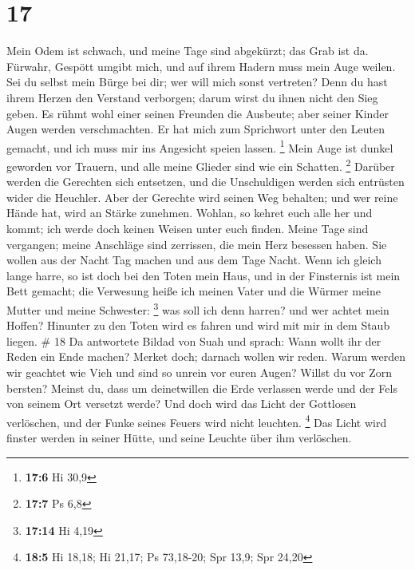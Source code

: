 \hypertarget{section-4}{%
\section{17}\label{section-4}}

 Mein Odem ist schwach, und meine Tage sind abgekürzt; das
Grab ist da.  Fürwahr, Gespött umgibt mich, und auf ihrem
Hadern muss mein Auge weilen.  Sei du selbst mein Bürge
bei dir; wer will mich sonst vertreten?  Denn du hast
ihrem Herzen den Verstand verborgen; darum wirst du ihnen nicht den Sieg
geben.  Es rühmt wohl einer seinen Freunden die Ausbeute;
aber seiner Kinder Augen werden verschmachten.  Er hat
mich zum Sprichwort unter den Leuten gemacht, und ich muss mir ins
Angesicht speien lassen. \footnote{\textbf{17:6} Hi 30,9} 
Mein Auge ist dunkel geworden vor Trauern, und alle meine Glieder sind
wie ein Schatten. \footnote{\textbf{17:7} Ps 6,8}  Darüber
werden die Gerechten sich entsetzen, und die Unschuldigen werden sich
entrüsten wider die Heuchler.  Aber der Gerechte wird
seinen Weg behalten; und wer reine Hände hat, wird an Stärke zunehmen.
 Wohlan, so kehret euch alle her und kommt; ich werde
doch keinen Weisen unter euch finden.  Meine Tage sind
vergangen; meine Anschläge sind zerrissen, die mein Herz besessen haben.
 Sie wollen aus der Nacht Tag machen und aus dem Tage
Nacht.  Wenn ich gleich lange harre, so ist doch bei den
Toten mein Haus, und in der Finsternis ist mein Bett gemacht;
 die Verwesung heiße ich meinen Vater und die Würmer
meine Mutter und meine Schwester: \footnote{\textbf{17:14} Hi 4,19}
 was soll ich denn harren? und wer achtet mein Hoffen?
 Hinunter zu den Toten wird es fahren und wird mit mir in
dem Staub liegen. \# 18  Da antwortete Bildad von Suah und
sprach:  Wann wollt ihr der Reden ein Ende machen? Merket
doch; darnach wollen wir reden.  Warum werden wir geachtet
wie Vieh und sind so unrein vor euren Augen?  Willst du
vor Zorn bersten? Meinst du, dass um deinetwillen die Erde verlassen
werde und der Fels von seinem Ort versetzt werde?  Und
doch wird das Licht der Gottlosen verlöschen, und der Funke seines
Feuers wird nicht leuchten. \footnote{\textbf{18:5} Hi 18,18; Hi 21,17;
  Ps 73,18-20; Spr 13,9; Spr 24,20}  Das Licht wird
finster werden in seiner Hütte, und seine Leuchte über ihm verlöschen.
